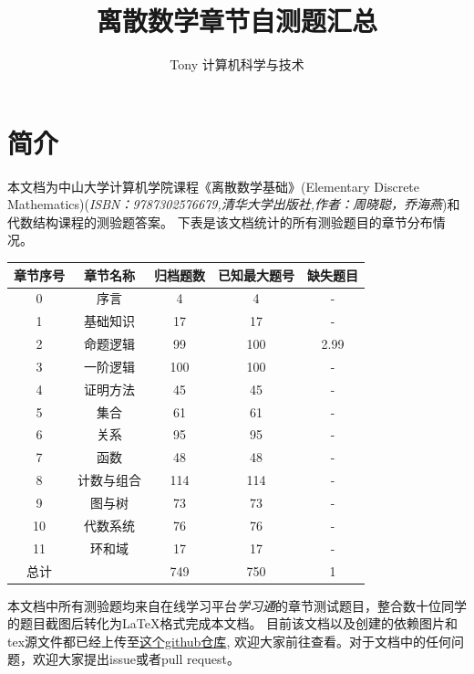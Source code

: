 \documentclass[UTF8, heading=true]{ctexart}
\title{\LARGE \textbf{离散数学章节自测题汇总}}
\author{Tony \hspace{2.89cm} 计算机科学与技术}
\begin{document}
\maketitle



{}
\section*{简介}

本文档为中山大学计算机学院课程《离散数学基础》(Elementary Discrete Mathematics)(\textit{ISBN：9787302576679,清华大学出版社,作者：周晓聪，乔海燕})和代数结构课程的测验题答案。
下表是该文档统计的所有测验题目的章节分布情况。
\begin{table}[H]
  \renewcommand{\arraystretch}{1.5}
  \centering
\begin{tabular}{|c|c|c|c|c|}
  \hline 章节序号 & 章节名称 & 归档题数 & 已知最大题号 & 缺失题目 \\
  \hline 0 & 序言 & 4 & 4 & - \\
  \hline 1 & 基础知识 & 17 & 17 & - \\
  \hline 2 & 命题逻辑 & 99 & 100 & 2.99 \\
  \hline 3 & 一阶逻辑 & 100 & 100 & - \\
  \hline 4 & 证明方法 & 45 & 45 & - \\
  \hline 5 & 集合 & 61 & 61 & - \\
  \hline 6 & 关系 & 95 & 95 & - \\
  \hline 7 & 函数 & 48 & 48 & - \\
  \hline 8 & 计数与组合 & 114 & 114 & - \\
  \hline 9 & 图与树 & 73 & 73 & - \\
  \hline 10 & 代数系统 & 76 & 76 & - \\
  \hline 11 & 环和域 & 17 & 17 & - \\
  \hline 总计& & 749 & 750 & 1 \\
  \hline
  \end{tabular}
\end{table}

本文档中所有测验题均来自在线学习平台\textit{学习通}的章节测试题目，整合数十位同学的题目截图后转化为LaTeX格式完成本文档。
目前该文档以及创建的依赖图片和tex源文件都已经上传至\href{https://github.com/BlackMaple1203/SYSU-Discrete-Mathematics-Exam-Answers}{这个github仓库},
欢迎大家前往查看。对于文档中的任何问题，欢迎大家提出issue或者pull request。
\end{document}
